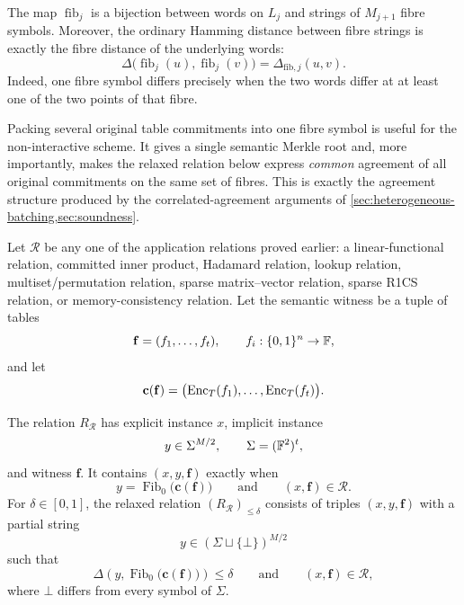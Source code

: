 The map $\operatorname{fib}_j$ is a bijection between words on $L_j$ and strings of $M_{j+1}$ fibre symbols.  Moreover, the ordinary Hamming distance between fibre strings is exactly the fibre distance of the underlying words:
\begin{equation}
  \Delta\bigl(\operatorname{fib}_j(u),\operatorname{fib}_j(v)\bigr)
  =\Delta_{\mathrm{fib},j}(u,v).
  \label{eq:pq-fibre-distance}
\end{equation}
Indeed, one fibre symbol differs precisely when the two words differ at at least one of the two points of that fibre.

Packing several original table commitments into one fibre symbol is useful for the non-interactive scheme.  It gives a single semantic Merkle root and, more importantly, makes the relaxed relation below express \emph{common} agreement of all original commitments on the same set of fibres.  This is exactly the agreement structure produced by the correlated-agreement arguments of \cref{sec:heterogeneous-batching,sec:soundness}.

Let $\mathcal R$ be any one of the application relations proved earlier: a linear-functional relation, committed inner product, Hadamard relation, lookup relation, multiset/permutation relation, sparse matrix--vector relation, sparse R1CS relation, or memory-consistency relation.  Let the semantic witness be a tuple of tables
\[
  \mathbf f=(f_1,\ldots,f_t),
  \qquad f_i:\{0,1\}^n\to\mathbb{F},
\]
and let
\[
  \mathbf c(\mathbf f)
  =\bigl(\operatorname{Enc}_T(f_1),\ldots,\operatorname{Enc}_T(f_t)\bigr).
\]

\begin{definition}
\label{def:pq-packed-relation}
The relation $R_{\mathcal R}$ has explicit instance $x$, implicit instance
\[
  y\in\Sigma^{M/2},
  \qquad
  \Sigma=(\mathbb{F}^2)^t,
\]
and witness $\mathbf f$.  It contains $(x,y,\mathbf f)$ exactly when
\begin{equation}
  y=\operatorname{Fib}_0\bigl(\mathbf c(\mathbf f)\bigr)
  \qquad\text{and}\qquad
  (x,\mathbf f)\in\mathcal R.
  \label{eq:pq-exact-relation}
\end{equation}
For $\delta\in[0,1]$, the relaxed relation $(R_{\mathcal R})_{\le\delta}$ consists of triples $(x,y,\mathbf f)$ with a partial string
\[
  y\in(\Sigma\sqcup\{\bot\})^{M/2}
\]
such that
\begin{equation}
  \Delta\left(
      y,
      \operatorname{Fib}_0\bigl(\mathbf c(\mathbf f)\bigr)
  \right)
  \le\delta
  \qquad\text{and}\qquad
  (x,\mathbf f)\in\mathcal R,
  \label{eq:pq-relaxed-relation}
\end{equation}
where $\bot$ differs from every symbol of $\Sigma$.
\end{definition}

